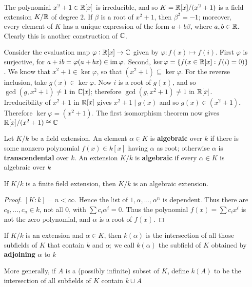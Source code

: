 \documentclass[11pt]{article}
\begin{document}
\begin{examplle}[]
The polynomial \(x^2+1\in\mathbb{R}[x]\) is irreducible, and so \(K=\mathbb{R}[x]/(x^2+1)\)
is a field extension \(K/\mathbb{R}\) of degree 2. If \(\beta\) is a root of \(x^2+1\), then 
\(\beta^2=-1\); moreover, every element of \(K\) has a unique expression of the
form \(a+b\beta\), where \(a,b\in\mathbb{R}\). Clearly this is another construction
of \(\mathbb{C}\).

Consider the evaluation map \(\varphi:\mathbb{R}[x]\to\mathbb{C}\) given by 
\(\varphi:f(x)\mapsto f(i)\). First \(\varphi\) is surjective, for
\(a+ib=\varphi(a+bx)\in\operatorname{im}\varphi\). Second,
\(\ker\varphi=\{f(x\in\mathbb{R}[x]:f(i)=0)\}\). We know that
\(x^2+1\in\ker\varphi\), so that \((x^2+1)\subseteq\ker\varphi\). For the
reverse inclusion, take \(g(x)\in\ker\varphi\). Now \(i\) is a root of \(g(x)\),
and so \(\gcd(g,x^2+1)\neq1\) in \(\mathbb{C}[x]\); therefore \(\gcd(g,x^2+1)\neq1\)
in \(\mathbb{R}[x]\). Irreducibility of \(x^2+1\) in \(\mathbb{R}[x]\) gives \(x^2+1\mid g(x)\)
and so \(g(x)\in(x^2+1)\). Therefore \(\ker\varphi=(x^2+1)\). The first
isomorphism theorem now gives \(\mathbb{R}[x]/(x^2+1)\cong\mathbb{C}\)
\end{examplle}


\begin{definition}[]
Let \(K/k\) be a field extension. An element \(\alpha\in K\) is \textbf{algebraic}
over \(k\) if there is some nonzero polynomial \(f(x)\in k[x]\) having \(\alpha\) as
root; otherwise \(\alpha\) is \textbf{transcendental} over \(k\). An extension \(K/k\) is
\textbf{algebraic} if every \(\alpha\in K\) is algebraic over \(k\)
\end{definition}

\begin{proposition}[]
If \(K/k\) is a finite field extension, then \(K/k\) is an algebraic
extension.
\end{proposition}

\begin{proof}
\([K:k]=n<\infty\). Hence the list of \(1,\alpha,\dots,\alpha^n\) is dependent. Thus
there are \(c_0,\dots,c_n\in k\), not all 0, with \(\sum c_i\alpha^i=0\). Thus
the polynomial \(f(x)=\sum c_ix^i\) is not the zero polynomial, and \(\alpha\) is a root
of \(f(x)\).
\end{proof}

\begin{definition}[]
If \(K/k\) is an extension and \(\alpha\in K\), then \(k(\alpha)\) is the
intersection of all those subfields of \(K\) that contain \(k\) and \(\alpha\); we call
\(k(\alpha)\) the subfield of \(K\) obtained by \textbf{adjoining} \(\alpha\) to \(k\)

More generally, if \(A\) is a (possibly infinite) subset of \(K\), define \(k(A)\)
to be the intersection of all subfields of \(K\) contain \(k\cup A\)
\end{definition}
\end{document}
